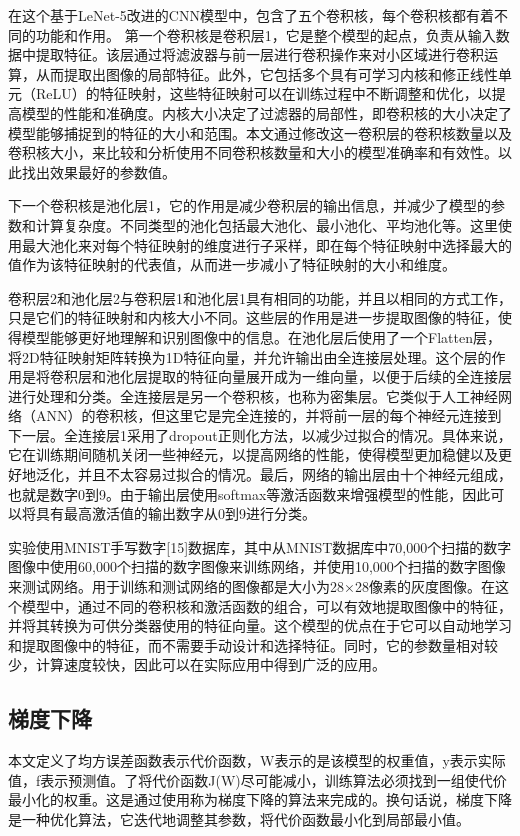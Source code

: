 \documentclass[11pt]{article}
\begin{document}
在这个基于LeNet-5改进的CNN模型中，包含了五个卷积核，每个卷积核都有着不同的功能和作用。
第一个卷积核是卷积层1，它是整个模型的起点，负责从输入数据中提取特征。该层通过将滤波器与前一层进行卷积操作来对小区域进行卷积运算，从而提取出图像的局部特征。此外，它包括多个具有可学习内核和修正线性单元（ReLU）的特征映射，这些特征映射可以在训练过程中不断调整和优化，以提高模型的性能和准确度。内核大小决定了过滤器的局部性，即卷积核的大小决定了模型能够捕捉到的特征的大小和范围。本文通过修改这一卷积层的卷积核数量以及卷积核大小，来比较和分析使用不同卷积核数量和大小的模型准确率和有效性。以此找出效果最好的参数值。

下一个卷积核是池化层1，它的作用是减少卷积层的输出信息，并减少了模型的参数和计算复杂度。不同类型的池化包括最大池化、最小池化、平均池化等。这里使用最大池化来对每个特征映射的维度进行子采样，即在每个特征映射中选择最大的值作为该特征映射的代表值，从而进一步减小了特征映射的大小和维度。

卷积层2和池化层2与卷积层1和池化层1具有相同的功能，并且以相同的方式工作，只是它们的特征映射和内核大小不同。这些层的作用是进一步提取图像的特征，使得模型能够更好地理解和识别图像中的信息。在池化层后使用了一个Flatten层，将2D特征映射矩阵转换为1D特征向量，并允许输出由全连接层处理。这个层的作用是将卷积层和池化层提取的特征向量展开成为一维向量，以便于后续的全连接层进行处理和分类。全连接层是另一个卷积核，也称为密集层。它类似于人工神经网络（ANN）的卷积核，但这里它是完全连接的，并将前一层的每个神经元连接到下一层。全连接层1采用了dropout正则化方法，以减少过拟合的情况。具体来说，它在训练期间随机关闭一些神经元，以提高网络的性能，使得模型更加稳健以及更好地泛化，并且不太容易过拟合的情况。最后，网络的输出层由十个神经元组成，也就是数字0到9。由于输出层使用softmax等激活函数来增强模型的性能，因此可以将具有最高激活值的输出数字从0到9进行分类。

实验使用MNIST手写数字[15]数据库，其中从MNIST数据库中70,000个扫描的数字图像中使用60,000个扫描的数字图像来训练网络，并使用10,000个扫描的数字图像来测试网络。用于训练和测试网络的图像都是大小为28×28像素的灰度图像。在这个模型中，通过不同的卷积核和激活函数的组合，可以有效地提取图像中的特征，并将其转换为可供分类器使用的特征向量。这个模型的优点在于它可以自动地学习和提取图像中的特征，而不需要手动设计和选择特征。同时，它的参数量相对较少，计算速度较快，因此可以在实际应用中得到广泛的应用。
\subsection{梯度下降}
\label{sec:org382ea2c}
本文定义了均方误差函数表示代价函数，W表示的是该模型的权重值，y表示实际值，f表示预测值。了将代价函数J(W)尽可能减小，训练算法必须找到一组使代价最小化的权重。这是通过使用称为梯度下降的算法来完成的。换句话说，梯度下降是一种优化算法，它迭代地调整其参数，将代价函数最小化到局部最小值。
\end{document}
